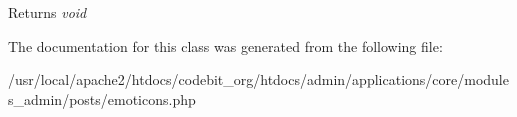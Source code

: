 \begin{DoxyReturn}{Returns}
{\itshape void} 
\end{DoxyReturn}


The documentation for this class was generated from the following file\-:\begin{DoxyCompactItemize}
\item 
/usr/local/apache2/htdocs/codebit\-\_\-org/htdocs/admin/applications/core/modules\-\_\-admin/posts/emoticons.\-php\end{DoxyCompactItemize}
